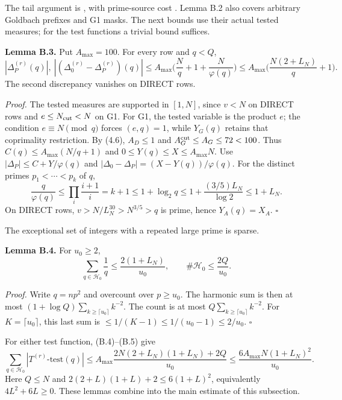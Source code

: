 The tail argument is \cite[Lemma~4.8]{Z1},
with prime-source cost \cite[Appendix~B, (B.5)--(B.6)]{Z1}.
Lemma B.2 also covers arbitrary Goldbach prefixes and G1 masks.
The next bounds use their actual tested measures;
for the test functions a trivial bound suffices.

\textbf{Lemma B.3.} Put $A_{\max}=100$.
For every row and $q<Q$,
\[
 |\Delta_P^{(r)}(q)|,\ |(\Delta_0^{(r)}-\Delta_P^{(r)})(q)|
 \le A_{\max}\Big(\frac Nq+1+\frac N{\varphi(q)}\Big)
 \le A_{\max}\Big(\frac{N(2+L_N)}q+1\Big).
 \tag{B.4}
\]
The second discrepancy vanishes on DIRECT rows.

\emph{Proof.} The tested measures are supported in $[1,N]$,
since $v<N$ on DIRECT rows and $e\le N_{\rm cut}<N$ on G1.
For G1, the tested variable is the product $e$; the condition
$e\equiv N\pmod q$ forces $(e,q)=1$, while $Y_G(q)$ retains that
coprimality restriction.
By (4.6), $A_D\le1$ and $A_G^{\rm cut}\le A_G\le72<100$.
Thus $C(q)\le A_{\max}(N/q+1)$ and $0\le Y(q)\le X\le A_{\max}N$.
Use $|\Delta_P|\le C+Y/\varphi(q)$ and
$|\Delta_0-\Delta_P|=(X-Y(q))/\varphi(q)$.
For the distinct primes $p_1<\cdots<p_k$ of $q$,
\[
 \frac q{\varphi(q)}\le\prod_i\frac{i+1}i=k+1
 \le1+\log_2q\le1+\frac{(3/5)L_N}{\log2}\le1+L_N.
\]
On DIRECT rows, $v>N/L_N^{30}>N^{3/5}>q$ is prime,
hence $Y_A(q)=X_A$. $\square$

The exceptional set of integers with a repeated large prime is sparse.

\textbf{Lemma B.4.} For $u_0\ge2$,
\[
 \sum_{q\in\mathcal H_0}\frac1q\le\frac{2(1+L_N)}{u_0},\qquad
 \#\mathcal H_0\le\frac{2Q}{u_0}.
 \tag{B.5}
\]

\emph{Proof.} Write $q=np^2$ and overcount over $p\ge u_0$.
The harmonic sum is then at most $(1+\log Q)\sum_{k\ge\lceil u_0\rceil}k^{-2}$.
The count is at most $Q\sum_{k\ge\lceil u_0\rceil}k^{-2}$.
For $K=\lceil u_0\rceil$, this last sum is
$\le1/(K-1)\le1/(u_0-1)\le2/u_0$. $\square$

For either test function, (B.4)--(B.5) give
\[
 \sum_{q\in\mathcal H_0}|T^{(r)}\text{-test}(q)|
 \le A_{\max}\frac{2N(2+L_N)(1+L_N)+2Q}{u_0}
 \le\frac{6A_{\max}N(1+L_N)^2}{u_0}.
 \tag{B.6}
\]
Here $Q\le N$ and $2(2+L)(1+L)+2\le6(1+L)^2$,
equivalently $4L^2+6L\ge0$.
These lemmas combine into the main estimate of this subsection.

